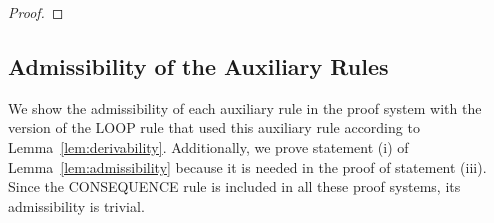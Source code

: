 \documentclass[runningheads]{llncs}       %
\begin{document}
\begin{proof}

\end{proof}



\subsection{Admissibility of the Auxiliary Rules}
\label{subsec:proof-admissibility}

We show the admissibility of each auxiliary rule in the proof system
with the version of the LOOP rule that used this auxiliary rule 
according to Lemma~\ref{lem:derivability}. 
Additionally, we prove statement (i) of Lemma~\ref{lem:admissibility} 
because it is needed in the proof of statement (iii).
Since the CONSEQUENCE rule is included in all these proof systems,
its admissibility is trivial.
\end{document}
